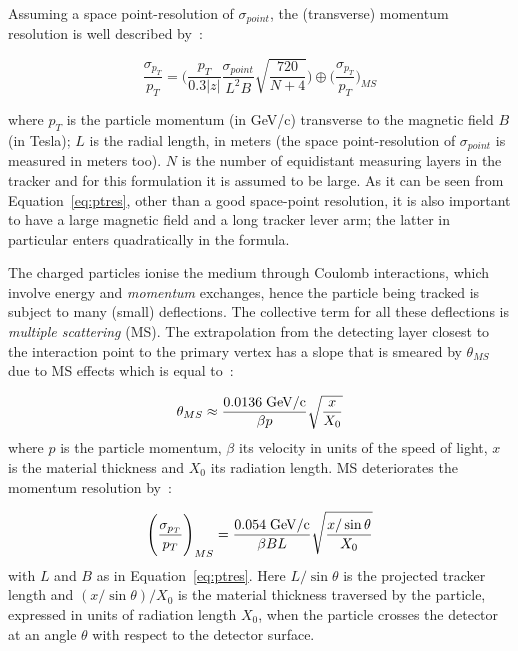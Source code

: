 Assuming a space point-resolution of $\sigma_{point}$, the (transverse) momentum resolution is well described by~\cite{GLUCKSTERN1963381,Olive:2016xmw,Garcia-Sciveres:2017ymt}:

\begin{equation}
\dfrac{\sigma_{p_{T}}}{p_{T}} = \Bigg( \dfrac{p_T}{0.3|z|}\dfrac{\sigma_{point}}{L^2B}\sqrt{\dfrac{720}{N+4}}\Bigg) \oplus \Bigg(\dfrac{\sigma_{p_{T}}}{p_{T}}\Bigg)_{MS}
\label{eq:ptres}
\end{equation} 

where $p_T$ is the particle momentum (in GeV/c) transverse to the magnetic field $B$ (in Tesla); 
$L$ is the radial length, in meters (the space point-resolution of $\sigma_{point}$ is measured in 
meters too). $N$ is the number of equidistant measuring layers in the tracker and for this formulation it is 
assumed to be large. As it can be seen from Equation~\ref{eq:ptres}, other than a good 
space-point resolution, it is also important to have a large magnetic field and a long tracker lever 
arm; the latter in particular enters quadratically in the formula. 

The charged particles ionise the medium through Coulomb interactions, which involve energy and 
{\it momentum} exchanges, hence the particle being tracked is subject to many (small) deflections. 
The collective term for all these deflections is {\it multiple scattering} (MS).
The extrapolation from the detecting layer closest to the interaction point to the primary vertex has a 
slope that is smeared by $\theta_{MS}$ due to MS effects which is equal to~\cite{Olive:2016xmw}:

\begin{equation}
  \theta_{MS} \approx \dfrac{0.0136\;{\rm GeV/c}}{\beta p}\sqrt{\dfrac{x}{X_0}}
  \label{eq:thetaMS}
\end{equation}
 where $p$ is the particle momentum, $\beta$ its velocity in units of the speed of light, $x$ is the material thickness and $X_0$ its radiation length. 
MS deteriorates the 
momentum resolution by~\cite{Garcia-Sciveres:2017ymt}:

\begin{equation}
\Bigg(\dfrac{\sigma_{p_{T}}}{p_{T}}\Bigg)_{MS} = \dfrac{0.054\;{\rm GeV/c}}{\beta B L}\sqrt{\dfrac{x/\sin\theta}{X_0}}
\label{eq:MS}
\end{equation} 
with $L$ and $B$ as in Equation~\ref{eq:ptres}. Here $L/\sin\theta$ is the projected tracker length
 and $(x/\sin\theta)/X_0$ is the material thickness traversed by the particle, expressed in units 
 of radiation length $X_0$, when the particle crosses the detector at an angle $\theta$ with respect 
 to the detector surface.
 
